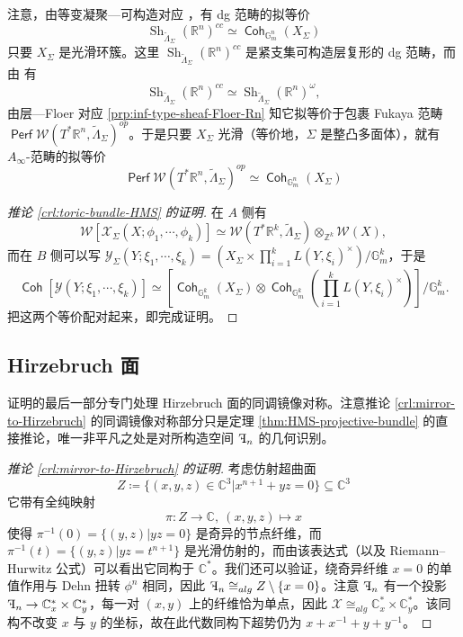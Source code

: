 \documentclass[11pt,a4paper]{article}
\DeclareMathOperator{\Coh}{\mathsf{Coh}}
\DeclareMathOperator{\Perf}{\mathsf{Perf}}
\DeclareMathOperator{\rF}{\reflectbox{F}}
\DeclareMathOperator{\Sh}{Sh}
\theoremstyle{cnth}
\begin{document}
注意，由等变凝聚—可构造对应 \cite{FLTZ11}，有 dg 范畴的拟等价 \[
    \Sh_{\widetilde{\Lambda}_{\Sigma}} (\mathbb{R}^n)^{cc}\simeq\Coh_{\mathbb{G}_m^n} (X_{\Sigma})
\]只要 $X_{\Sigma}$ 是光滑环簇。这里 $\Sh_{\widetilde{\Lambda}_{\Sigma}} (\mathbb{R}^n)^{cc}$ 是紧支集可构造层复形的 dg 范畴，而由 \cite[Lemma 4.18]{GPS24M} 有 \[
    \Sh_{\widetilde{\Lambda}_{\Sigma}} (\mathbb{R}^n)^{cc}\simeq\Sh_{\widetilde{\Lambda}_{\Sigma}} (\mathbb{R}^n)^{\omega},
\]由层—Floer 对应 \ref{prp:inf-type-sheaf-Floer-Rn} 知它拟等价于包裹 Fukaya 范畴 $\Perf\mathcal{W} (T^{\ast}\mathbb{R}^n,\widetilde{\Lambda}_{\Sigma})^{op}$。于是只要 $X_{\Sigma}$ 光滑（等价地，$\Sigma$ 是整凸多面体），就有 $A_{\infty}$-范畴的拟等价 \[
    \Perf\mathcal{W} (T^{\ast}\mathbb{R}^n,\widetilde{\Lambda}_{\Sigma})^{op}\simeq\Coh_{\mathbb{G}_m^n} (X_{\Sigma})
\]
\begin{proof}[推论 \ref{crl:toric-bundle-HMS} 的证明]
    在 $A$ 侧有 \[
        \mathcal{W}\left[\mathcal{X}_{\Sigma} (X;\phi_1,\dotsb ,\phi_k)\right]\simeq\mathcal{W} (T^{\ast}\mathbb{R}^k,\widetilde{\Lambda}_{\Sigma})\otimes_{\mathbb{Z}^k}\mathcal{W} (X),
    \]而在 $B$ 侧可以写 $\mathcal{Y}_{\Sigma} (Y;\xi_1,\dotsb ,\xi_k)=\left(X_{\Sigma}\times \prod_{i=1}^k L(Y,\xi_i)^{\times}\right)/\mathbb{G}_m^k$，于是 \[
        \Coh\left[\mathcal{Y} (Y;\xi_1,\dotsb ,\xi_k)\right]\simeq\left[\Coh_{\mathbb{G}_m^k} (X_{\Sigma})\otimes\Coh_{\mathbb{G}_m^k} \left(\prod_{i=1}^kL(Y,\xi_i)^{\times}\right)\right]\Big/\mathbb{G}_m^k.
    \]
把这两个等价配对起来，即完成证明。
\end{proof}

\subsection{Hirzebruch 面}

证明的最后一部分专门处理 Hirzebruch 面的同调镜像对称。注意推论 \ref{crl:mirror-to-Hirzebruch} 的同调镜像对称部分只是定理 \ref{thm:HMS-projective-bundle} 的直接推论，唯一非平凡之处是对所构造空间 $\rF_n$ 的几何识别。

\begin{proof}[推论 \ref{crl:mirror-to-Hirzebruch} 的证明]
    考虑仿射超曲面 \[
            Z\coloneqq\{(x,y,z)\in\mathbb{C}^3\vert x^{n+1}+yz=0\}\subseteq\mathbb{C}^3
        \]它带有全纯映射 \[
            \pi\colon Z\to\mathbb{C},\ (x,y,z)\mapsto x
        \]使得 $\pi^{-1} (0)=\{(y,z)\vert yz=0\}$ 是奇异的节点纤维，而 $\pi^{-1} (t)=\{(y,z)\vert yz =t^{n+1}\}$ 是光滑仿射的，而由该表达式（以及 Riemann--Hurwitz 公式）可以看出它同构于 $\mathbb{C}^{\ast}$。我们还可以验证，绕奇异纤维 $x=0$ 的单值作用与 Dehn 扭转 $\phi^n$ 相同，因此 $\rF_n\cong_{alg} Z\setminus\{x=0\}$。注意 $\rF_n$ 有一个投影 $\rF_n\to\mathbb{C}_x^{\ast}\times\mathbb{C}_y^{\ast}$，每一对 $(x,y)$ 上的纤维恰为单点，因此 $\mathcal{X}\cong_{alg}\mathbb{C}_x^{\ast}\times\mathbb{C}_y^{\ast}$。该同构不改变 $x$ 与 $y$ 的坐标，故在此代数同构下超势仍为 $x+x^{-1} +y+y^{-1}$。
\end{proof}
\end{document}
